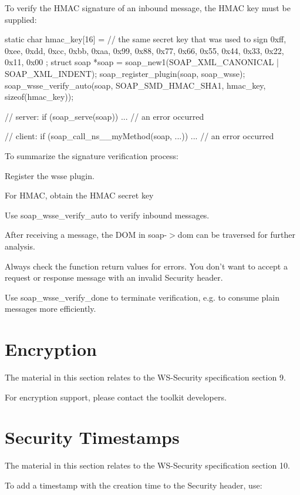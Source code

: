 To verify the HMAC signature of an inbound message, the HMAC key must be supplied:


\begin{DoxyCode}
    static char hmac_key[16] = // the same secret key that was used to sign
    { 0xff, 0xee, 0xdd, 0xcc, 0xbb, 0xaa, 0x99, 0x88,
      0x77, 0x66, 0x55, 0x44, 0x33, 0x22, 0x11, 0x00 };
    struct soap *soap = soap_new1(SOAP_XML_CANONICAL | SOAP_XML_INDENT);
    soap_register_plugin(soap, soap_wsse);
    soap_wsse_verify_auto(soap, SOAP_SMD_HMAC_SHA1, hmac_key, sizeof(hmac_key));

    // server:
    if (soap_serve(soap))
      ... // an error occurred

    // client:
    if (soap_call_ns__myMethod(soap, ...))
      ... // an error occurred
\end{DoxyCode}


To summarize the signature verification process:
\begin{DoxyEnumerate}
\item Register the wsse plugin.
\item For HMAC, obtain the HMAC secret key
\item Use soap\_\-wsse\_\-verify\_\-auto to verify inbound messages.
\item After receiving a message, the DOM in soap-\/$>$dom can be traversed for further analysis.
\item Always check the function return values for errors. You don't want to accept a request or response message with an invalid Security header.
\item Use soap\_\-wsse\_\-verify\_\-done to terminate verification, e.g. to consume plain messages more efficiently.
\end{DoxyEnumerate}\hypertarget{wsse_wsse_9}{}\section{Encryption}\label{wsse_wsse_9}
The material in this section relates to the WS-\/Security specification section 9.

For encryption support, please contact the toolkit developers.\hypertarget{wsse_wsse_10}{}\section{Security Timestamps}\label{wsse_wsse_10}
The material in this section relates to the WS-\/Security specification section 10.

To add a timestamp with the creation time to the Security header, use:


